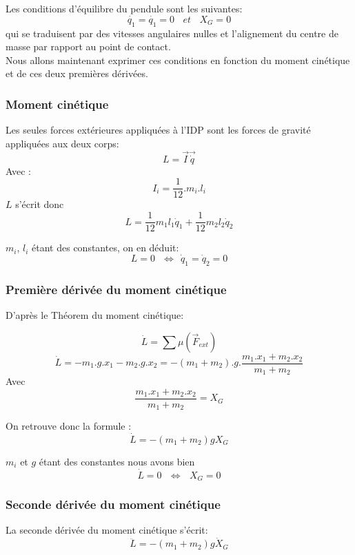 \documentclass[a4paper,12pt]{report}
\begin{document}
Les conditions d'équilibre du pendule sont les suivantes:
$$ \dot{q_1} = \dot{q_1} = 0 \ \ \ \ et \ \ \ \ X_G = 0 $$
qui se traduisent par des vitesses angulaires nulles et l'alignement du centre de masse par rapport au point de contact.\\

Nous allons maintenant exprimer ces conditions en fonction du moment cinétique et de ces deux premières dérivées.

\subsubsection{Moment cinétique}
Les seules forces extérieures appliquées à l'IDP sont les forces de gravité appliquées aux deux corps:
$$ L = \overrightarrow I \overrightarrow{\dot{q}} $$
Avec : $$I_i = \frac{1}{12}.m_i.l_i$$
$L$ s'écrit donc
$$L = \frac{1}{12} m_1 l_1 \dot{q}_1 + \frac{1}{12} m_2 l_2 \dot{q}_2$$

$m_i$, $l_i$ étant des constantes, on en déduit:
$$ L = 0 \ \ \ \Leftrightarrow \ \ \dot{q}_1 = \dot{q}_2 = 0 $$

\subsubsection{Première dérivée du moment cinétique}


D'après le Théorem du moment cinétique:

$$\dot{L} = \sum{}{\mu(\overrightarrow{F}_{ext})} $$
$$\dot{L} = -m_1.g.x_1 - m_2.g.x_2 = - (m_1 + m_2).g.\frac{m_1.x_1 + m_2.x_2}{m_1 + m_2}$$
Avec $$\frac{m_1.x_1 + m_2.x_2}{m_1 + m_2} = X_G$$


On retrouve donc la formule :
$$\dot{L} = - (m_1 + m_2)g X_G$$

$m_i$ et $g$ étant des constantes nous avons bien
$$\dot{L} = 0 \ \ \ \Leftrightarrow \ \ \ X_G = 0$$

\subsubsection{Seconde dérivée du moment cinétique}
La seconde dérivée du moment cinétique s'écrit:
$$\ddot{L} = - (m_1 + m_2)g \dot{X}_G$$
\end{document}

